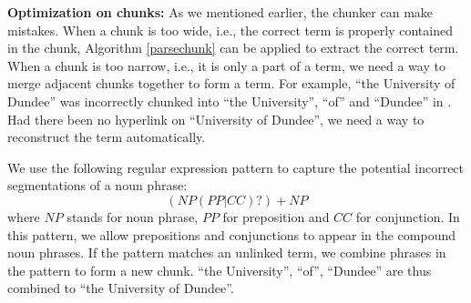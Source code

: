 \textbf{Optimization on chunks:}
As we mentioned earlier, the chunker can make mistakes. When a chunk
is too wide, i.e., the correct term is properly contained in the chunk,
Algorithm \ref{parsechunk}  can be applied to extract the correct term.
When a chunk is too narrow, i.e., it is only a part of a term, we need
a way to merge adjacent chunks together to form a term.
For example, ``the University of Dundee'' was incorrectly
chunked into ``the University'',
``of'' and ``Dundee'' in . Had there been no hyperlink
on ``University of Dundee'', we need a way to reconstruct the term
automatically.

We use the following regular expression pattern to capture the potential
incorrect segmentations of a noun phrase:
\[(NP(PP|CC)?)+NP\]
where $NP$ stands for noun phrase, $PP$ for preposition and $CC$ for conjunction.
In this pattern, we allow prepositions and conjunctions to appear in
the compound noun phrases.  If the pattern matches an unlinked term,
we combine phrases in the pattern to form a new chunk.
``the University'', ``of'', ``Dundee'' are thus combined to
``the University of Dundee''.

